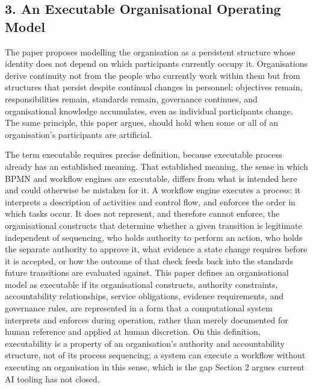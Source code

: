 \documentclass[
]{article}
\begin{document}
\hypertarget{an-executable-organisational-operating-model}{%
\subsection{3. An Executable Organisational Operating
Model}\label{an-executable-organisational-operating-model}}

The paper proposes modelling the organisation as a persistent structure
whose identity does not depend on which participants currently occupy
it. Organisations derive continuity not from the people who currently
work within them but from structures that persist despite continual
changes in personnel: objectives remain, responsibilities remain,
standards remain, governance continues, and organisational knowledge
accumulates, even as individual participants change. The same principle,
this paper argues, should hold when some or all of an organisation's
participants are artificial.

The term executable requires precise definition, because executable
process already has an established meaning. That established meaning,
the sense in which BPMN and workflow engines are executable, differs
from what is intended here and could otherwise be mistaken for it. A
workflow engine executes a process: it interprets a description of
activities and control flow, and enforces the order in which tasks
occur. It does not represent, and therefore cannot enforce, the
organisational constructs that determine whether a given transition is
legitimate independent of sequencing, who holds authority to perform an
action, who holds the separate authority to approve it, what evidence a
state change requires before it is accepted, or how the outcome of that
check feeds back into the standards future transitions are evaluated
against. This paper defines an organisational model as executable if its
organisational constructs, authority constraints, accountability
relationships, service obligations, evidence requirements, and
governance rules, are represented in a form that a computational system
interprets and enforces during operation, rather than merely documented
for human reference and applied at human discretion. On this definition,
executability is a property of an organisation's authority and
accountability structure, not of its process sequencing; a system can
execute a workflow without executing an organisation in this sense,
which is the gap Section 2 argues current AI tooling has not closed.
\end{document}
